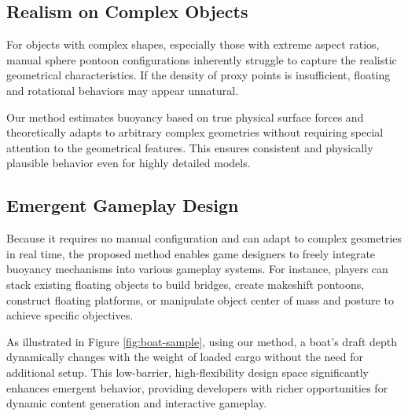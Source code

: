 \subsection{Realism on Complex Objects}

For objects with complex shapes, especially those with extreme aspect ratios, manual sphere pontoon configurations inherently struggle to capture the realistic geometrical characteristics. If the density of proxy points is insufficient, floating and rotational behaviors may appear unnatural.

Our method estimates buoyancy based on true physical surface forces and theoretically adapts to arbitrary complex geometries without requiring special attention to the geometrical features. This ensures consistent and physically plausible behavior even for highly detailed models.

\subsection{Emergent Gameplay Design}

Because it requires no manual configuration and can adapt to complex geometries in real time, the proposed method enables game designers to freely integrate buoyancy mechanisms into various gameplay systems. For instance, players can stack existing floating objects to build bridges, create makeshift pontoons, construct floating platforms, or manipulate object center of mass and posture to achieve specific objectives.

As illustrated in Figure \ref{fig:boat-sample}, using our method, a boat's draft depth dynamically changes with the weight of loaded cargo without the need for additional setup. This low-barrier, high-flexibility design space significantly enhances emergent behavior, providing developers with richer opportunities for dynamic content generation and interactive gameplay.

